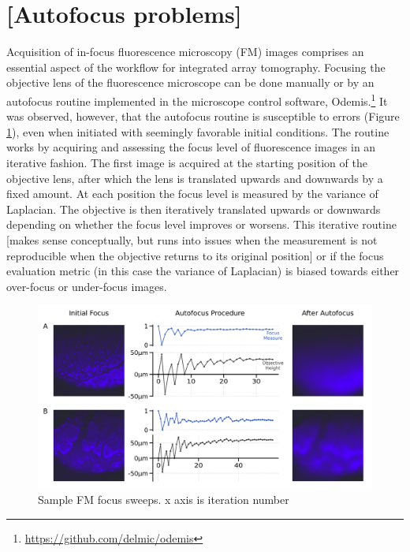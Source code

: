 \section{[Autofocus problems]}
\label{sec:A.1_title}

Acquisition of in-focus fluorescence microscopy (FM) images comprises an essential aspect of the workflow for integrated array tomography. Focusing the objective lens of the fluorescence microscope can be done manually or by an autofocus routine implemented in the microscope control software, Odemis.\footnote{\href{https://github.com/delmic/odemis}{https://github.com/delmic/odemis}} It was observed, however, that the autofocus routine is susceptible to errors (Figure \ref{fig:A.1_afruns}), even when initiated with seemingly favorable initial conditions. The routine works by acquiring and assessing the focus level of fluorescence images in an iterative fashion. The first image is acquired at the starting position of the objective lens, after which the lens is translated upwards and downwards by a fixed amount. At each position the focus level is measured by the variance of Laplacian. The objective is then iteratively translated upwards or downwards depending on whether the focus level improves or worsens. This iterative routine [makes sense conceptually, but runs into issues when the measurement is not reproducible when the objective returns to its original position] or if the focus evaluation metric (in this case the variance of Laplacian) is biased towards either over-focus or under-focus images.

\begin{figure}[!tbh]
    \centering
    \includegraphics[width=\linewidth]{cppendix-A/figures/fig1_afruns_v3.pdf}
    \caption{Sample FM focus sweeps. x axis is iteration number}
    \label{fig:A.1_afruns}
\end{figure}


